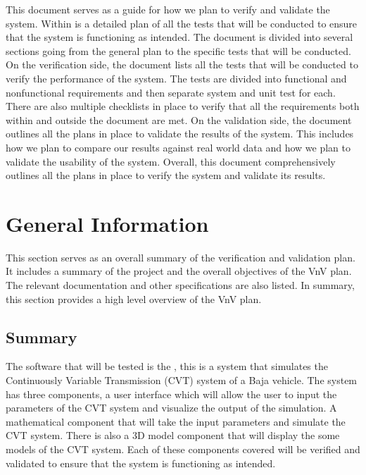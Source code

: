\documentclass[12pt, titlepage]{article}
\begin{document}
\newpage


\noindent This document serves as a guide for how we plan to verify and validate the \progname{} system.
Within is a detailed plan of all the tests that will be conducted to ensure that the system is functioning as intended.
The document is divided into several sections going from the general plan to the specific tests that will be conducted.
On the verification side, the document lists all the tests that will be conducted to verify the performance of the system.
The tests are divided into functional and nonfunctional requirements and then separate system and unit test for each.
There are also multiple checklists in place to verify that all the requirements both within and outside the document are met.
On the validation side, the document outlines all the plans in place to validate the results of the system.
This includes how we plan to compare our results against real world data and how we plan to validate the usability of the system.
Overall, this document comprehensively outlines all the plans in place to verify the system and validate its results.

\section{General Information}

This section serves as an overall summary of the verification and validation plan.
It includes a summary of the project and the overall objectives of the VnV plan.
The relevant documentation and other specifications are also listed.
In summary, this section provides a high level overview of the VnV plan.

\subsection{Summary}

The software that will be tested is the \progname{}, this is a system that simulates the Continuously Variable Transmission (CVT) system of a Baja vehicle.
The system has three components, a user interface which will allow the user to input the parameters of the CVT system and visualize the output of the simulation.
A mathematical component that will take the input parameters and simulate the CVT system.
There is also a 3D model component that will display the some models of the CVT system. 
Each of these components covered will be verified and validated to ensure that the system is functioning as intended.
\end{document}
